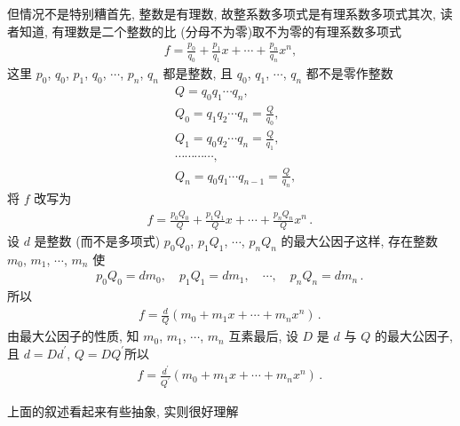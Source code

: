 但情况不是特别糟\period 首先, 整数是有理数, 故整系数多项式是有理系数多项式\period 其次, 读者知道, 有理数是二个整数的比 (分母不为零)\period 取不为零的有理系数多项式
\begin{align*}
    f = \frac{p_0}{q_0} + \frac{p_1}{q_1} x + \cdots + \frac{p_n}{q_n} x^n,
\end{align*}
这里 $p_0$, $q_0$, $p_1$, $q_0$, $\cdots$, $p_n$, $q_n$ 都是整数, 且 $q_0$, $q_1$, $\cdots$, $q_n$ 都不是零\period 作整数
\begin{align*}
     & Q = q_0 q_1 \cdots q_n,                       \\
     & Q_0 = q_1 q_2 \cdots q_n = \frac{Q}{q_0},     \\
     & Q_1 = q_0 q_2 \cdots q_n = \frac{Q}{q_1},     \\
     & \cdots \cdots \cdots \cdots,                  \\
     & Q_n = q_0 q_1 \cdots q_{n-1} = \frac{Q}{q_n},
\end{align*}
将 $f$ 改写为
\begin{align*}
    f = \frac{p_0 Q_0}{Q} + \frac{p_1 Q_1}{Q} x + \cdots + \frac{p_n Q_n}{Q} x^n \period
\end{align*}
设 $d$ 是整数 (而不是多项式) $p_0 Q_0$, $p_1 Q_1$, $\cdots$, $p_n Q_n$ 的最大公因子\period 这样, 存在整数 $m_0$, $m_1$, $\cdots$, $m_n$ 使
\begin{align*}
    p_0 Q_0 = d m_0, \quad p_1 Q_1 = d m_1, \quad \cdots, \quad p_n Q_n = d m_n \period
\end{align*}
所以
\begin{align*}
    f = \frac{d}{Q} (m_0 + m_1 x + \cdots + m_n x^n) \period
\end{align*}
由最大公因子的性质, 知 $m_0$, $m_1$, $\cdots$, $m_n$ 互素\period 最后, 设 $D$ 是 $d$ 与 $Q$ 的最大公因子, 且 $d = Dd^{\prime}$, $Q = DQ^{\prime}$\period 所以
\begin{align*}
    f = \frac{d^{\prime}}{Q^{\prime}} (m_0 + m_1 x + \cdots + m_n x^n) \period
\end{align*}

上面的叙述看起来有些抽象, 实则很好理解\period

